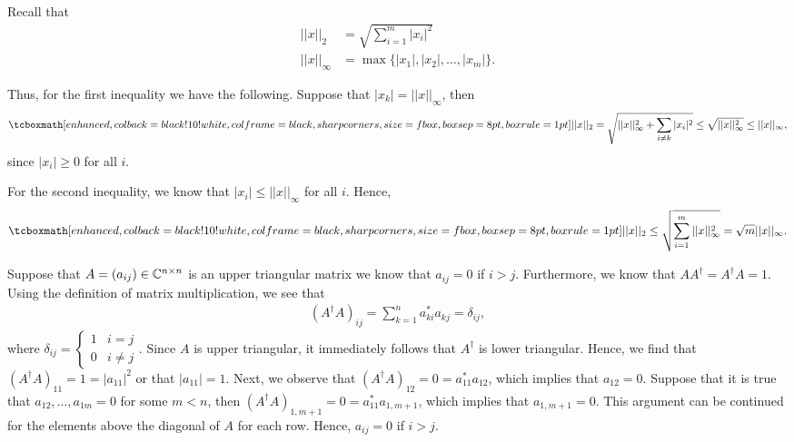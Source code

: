 \def\duedate{09/29/22}
\def\HWnum{1}


\setlength{\headheight}{14.9998pt}
\addtolength{\topmargin}{-2.49998pt}


    

Recall that 
\begin{align}
    \label{eq:norm-def}
    ||x||_{2} &= \sqrt{\sum_{i=1}^{m} |x_{i}|^{2}} \\
    ||x||_{\infty} &= \max \{ |x_1|,|x_2|, \ldots, |x_{m}| \} 
.\end{align}

Thus, for the first inequality we have the following.
Suppose that $|x_{k}| = ||x||_{\infty}$, then
\begin{eqnarray}
    \label{eq:derive-1st-inequality}
    \eqbox{
    ||x||_{2} = \sqrt{||x||_{\infty}^2 + \sum_{i \ne k} |x_{i}|^2} \leq \sqrt{||x||_{\infty}^2} \leq ||x||_{\infty}
}
,\end{eqnarray}
since $|x_{i}| \geq 0$ for all $i$.

For the second inequality, we know that $|x_{i}| \leq ||x||_{\infty}$ for all $i$.
Hence,
\begin{eqnarray}
    \label{eq:derive-2nd-inequality}
    \eqbox{
    ||x||_{2} \leq \sqrt{\sum_{i=1}^{m} ||x||_{\infty}^2} = \sqrt{m}||x||_{\infty} 
}
.\end{eqnarray}




Suppose that $A = (a_{ij}) \in \mathbb{C}^{n \times n}$ is an upper triangular matrix we know that $a_{ij} = 0$ if $i > j$.
Furthermore, we know that $A A^{\dagger} = A^{\dagger}A = 1$.
Using the definition of matrix multiplication, we see that
\begin{eqnarray}
    \label{eq:A-Adag}
    (A^{\dagger} A)_{ij} = \sum_{k=1}^{n} a_{ki}^{*}a_{kj} = \delta_{ij} 
,\end{eqnarray}
where $\displaystyle \delta_{ij} = \begin{cases}
    1 & i = j \\
    0 & i \ne j
\end{cases}$.
Since $A$ is upper triangular, it immediately follows that $A^{\dagger}$ is lower triangular. 
Hence, we find that $(A^{\dagger}A)_{11} = 1 = |a_{11}|^2$ or that $|a_{11}| = 1$.
Next, we observe that $(A^{\dagger} A)_{12} = 0 = a_{11}^{*}a_{12}$, which implies that $a_{12} = 0$.
Suppose that it is true that $a_{12},\ldots,a_{1 m} = 0$ for some $m < n$, then $(A^{\dagger} A)_{1,m+1} = 0 = a_{1 1}^{*}a_{1,m + 1}$, which implies that $a_{1,m+1} = 0$.
This argument can be continued for the elements above the diagonal of $A$ for each row.
Hence, $a_{ij} = 0$ if $i > j$.

